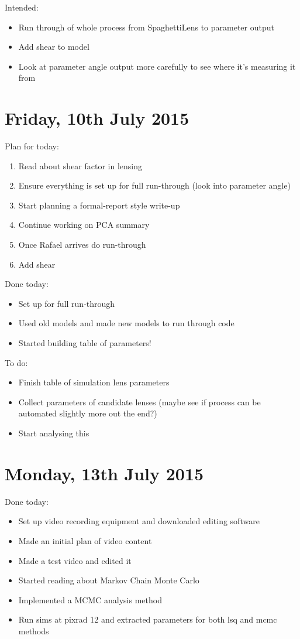 \documentclass{article}
\begin{document}
\noindent Intended:
\begin{itemize}
  \item Run through of whole process from SpaghettiLens to parameter output
  \item Add shear to model
  \item Look at parameter angle output more carefully to see where it's measuring it from
\end{itemize}\newpage

\section{Friday, 10th July 2015}
\noindent Plan for today:
\begin{enumerate}
  \item Read about shear factor in lensing
  \item Ensure everything is set up for full run-through (look into parameter angle)
  \item Start planning a formal-report style write-up
  \item Continue working on PCA summary
  \item Once Rafael arrives do run-through
  \item Add shear
\end{enumerate}

\noindent Done today:
\begin{itemize}
  \item Set up for full run-through
  \item Used old models and made new models to run through code
  \item Started building table of parameters!
\end{itemize}

\noindent To do:
\begin{itemize}
  \item Finish table of simulation lens parameters
  \item Collect parameters of candidate lenses (maybe see if process can be automated slightly more out the end?)
  \item Start analysing this
\end{itemize}\newpage

\section{Monday, 13th July 2015}
\noindent Done today:
\begin{itemize}
  \item Set up video recording equipment and downloaded editing software
  \item Made an initial plan of video content
  \item Made a test video and edited it
  \item Started reading about Markov Chain Monte Carlo
  \item Implemented a MCMC analysis method
  \item Run sims at pixrad 12 and extracted parameters for both lsq and mcmc methods
\end{itemize}
\end{document}
